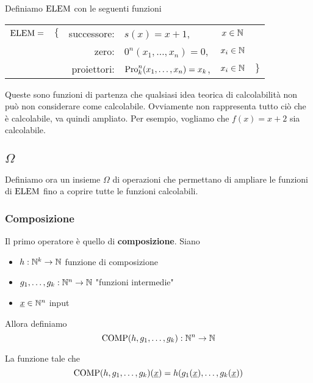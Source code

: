 Definiamo $\text{ELEM}$ con le seguenti funzioni
\begin{center}
	\begin{tabular}{r c r l c l}
		$\text{ELEM} = $ & $\{$ & successore: & $s(x) = x + 1$, & $x \in \mathbb{N}$ & \\
		&& zero: & $0^n (x_1, \dots, x_n) = 0$, & $x_i \in \mathbb{N}$ & \\
		&& proiettori: & $\text{Pro}_k^n (x_1, \dots, x_n) = x_k$, & $x_i \in \mathbb{N}$& $\}$ \\
	\end{tabular}
\end{center}

Queste sono funzioni di partenza che qualsiasi idea teorica di calcolabilità non può non considerare come calcolabile. Ovviamente non rappresenta tutto ciò che è calcolabile, va quindi ampliato. Per esempio, vogliamo che $f(x) = x+2$ sia calcolabile.

\subsection{$\Omega$}

Definiamo ora un insieme $\Omega$ di operazioni che permettano di ampliare le funzioni di $\text{ELEM}$ fino a coprire tutte le funzioni calcolabili.

\subsubsection{Composizione}

Il primo operatore è quello di \textbf{composizione}. Siano
\begin{itemize}
	\item $h: \mathbb{N}^k \rightarrow \mathbb{N}$ funzione di composizione

	\item $g_1, \dots, g_k: \mathbb{N}^n \rightarrow \mathbb{N}$ "funzioni intermedie"

	\item $\underline{x} \in \mathbb{N}^n$ input
\end{itemize}

Allora definiamo 
$$ \text{COMP} (h, g_1, \dots, g_k): \mathbb{N}^n \rightarrow \mathbb{N} $$

La funzione tale che
$$ \text{COMP} (h, g_1, \dots, g_k) (\underline{x}) = h(g_1(\underline{x}), \dots, g_k (\underline{x})) $$

\begin{center}
	
\end{center}


